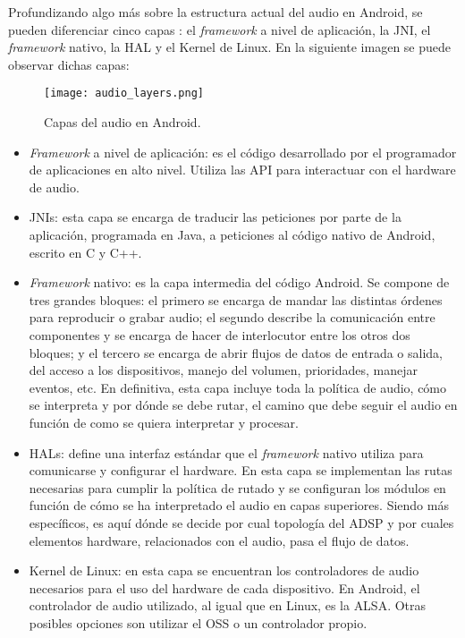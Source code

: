 Profundizando algo más sobre la estructura actual del audio en Android, se pueden diferenciar cinco capas \cite{audio_android}: el \textit{framework} a nivel de aplicación, la \gls{JNI}, el \textit{framework} nativo, la \gls{HAL} y el Kernel de Linux. En la siguiente imagen se puede observar dichas capas:

\begin{wrapfigure}{l}{0.47\textwidth}
	\centering
	\texttt{[image: audio\_layers.png]}
	\caption[Capas del audio en Android]{Capas del audio en Android.}
	\label{fig:audio_layers}
\end{wrapfigure}

\hfill

\begin{itemize}
	\item{\textit{Framework} a nivel de aplicación: es el código desarrollado por el programador de aplicaciones en alto nivel. Utiliza las \gls{API} para interactuar con el hardware de audio.}	
	\item{\glspl{JNI}: esta capa se encarga de traducir las peticiones por parte de la aplicación, programada en Java, a peticiones al código nativo de Android, escrito en C y C++.}
\end{itemize}

\begin{itemize}
	\item{\textit{Framework} nativo: es la capa intermedia del código Android. Se compone de tres grandes bloques: el primero se encarga de mandar las distintas órdenes para reproducir o grabar audio; el segundo describe la comunicación entre componentes y se encarga de hacer de interlocutor entre los otros dos bloques; y el tercero se encarga de abrir flujos de datos de entrada o salida, del acceso a los dispositivos, manejo del volumen, prioridades, manejar eventos, etc. En definitiva, esta capa incluye toda la política de audio, cómo se interpreta y por dónde se debe rutar, el camino que debe seguir el audio en función de como se quiera interpretar y procesar.}
\end{itemize}

\begin{itemize}
	\item{\glspl{HAL}: define una interfaz estándar que el \textit{framework} nativo utiliza para comunicarse y configurar el hardware. En esta capa se implementan las rutas necesarias para cumplir la política de rutado y se configuran los módulos en función de cómo se ha interpretado el audio en capas superiores. Siendo más específicos, es aquí dónde se decide por cual topología del \gls{ADSP} y por cuales elementos hardware, relacionados con el audio, pasa el flujo de datos.}
	\item{Kernel de Linux: en esta capa se encuentran los controladores de audio necesarios para el uso del hardware de cada dispositivo. En Android, el controlador de audio utilizado, al igual que en Linux, es la \gls{ALSA}. Otras posibles opciones son utilizar el \gls{OSS} o un controlador propio.}
\end{itemize}


